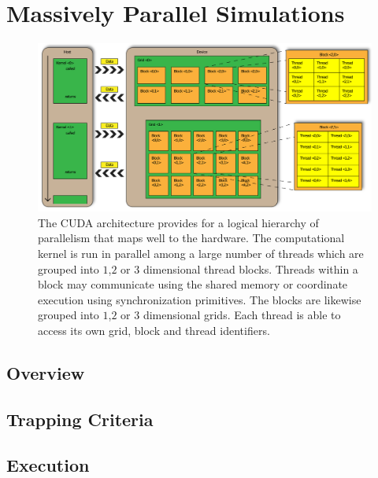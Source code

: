 \documentclass[twocolumn,10pt]{asme2ej}
\begin{document}
\section{Massively Parallel Simulations}
\label{sec:parallel-simulations}

\begin{figure}[htb!]
\includegraphics[width=2\columnwidth]{figures/cuda_architecture}
\caption{The CUDA architecture provides for a logical hierarchy of
  parallelism that maps well to the hardware.  The computational
  kernel is run in parallel among a large number of threads which are
  grouped into $1$,$2$ or $3$ dimensional thread blocks.  Threads
  within a block may communicate using the shared memory or coordinate
  execution using synchronization primitives.  The blocks are likewise
  grouped into $1$,$2$ or $3$ dimensional grids.  Each thread is able
  to access its own grid, block and thread identifiers.}
\label{fig:cuda_arch}
\end{figure}


\subsection{Overview}
\label{sec:parallel-overview}


\subsection{Trapping Criteria}
\label{sec:trapping-criteria}


\subsection{Execution}
\label{sec:execution-main}
\end{document}

